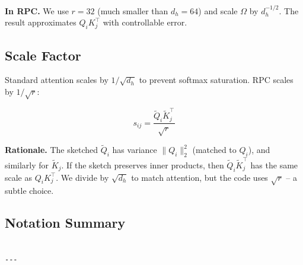 \textbf{In RPC.} We use $r = 32$ (much smaller than $d_h = 64$) and scale 
$\Omega$ by $d_h^{-1/2}$. The result approximates $Q_i K_j^\top$ with 
controllable error.

\subsection{Scale Factor}

Standard attention scales by $1/\sqrt{d_h}$ to prevent softmax saturation. 
RPC scales by $1/\sqrt{r}$:

\[
s_{ij} = \frac{\tilde{Q}_i \tilde{K}_j^\top}{\sqrt{r}}
\tag{3.6}
\]

\textbf{Rationale.} The sketched $\tilde{Q}_i$ has variance $\|Q_i\|_2^2$ 
(matched to $Q_i$), and similarly for $\tilde{K}_j$. If the sketch preserves 
inner products, then $\tilde{Q}_i \tilde{K}_j^\top$ has the same scale as 
$Q_i K_j^\top$. We divide by $\sqrt{d_h}$ to match attention, but the code 
uses $\sqrt{r}$ -- a subtle choice.

\subsection{Notation Summary}

\begin{lstlisting}

---
\end{lstlisting}